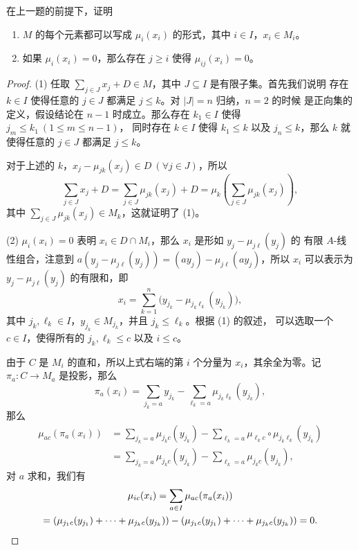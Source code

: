 \begin{problem}
  在上一题的前提下，证明
  \begin{enumerate}
    \item $M$ 的每个元素都可以写成 $\mu_i(x_i)$ 的形式，其中 $i\in I$，$x_i\in M_i$。
    \item 如果 $\mu_i(x_i)=0$，那么存在 $j\geq i$ 使得 $\mu_{ij}(x_i)=0$。
  \end{enumerate}
\end{problem}
\begin{proof}
  (1) 任取 $\sum_{j\in J}x_j+D\in M$，其中 $J\subseteq I$ 是有限子集。首先我们说明
  存在 $k\in I$ 使得任意的 $j\in J$ 都满足 $j\leq k$。对 $|J|=n$ 归纳，$n=2$ 的时候
  是正向集的定义，假设结论在 $n-1$ 时成立。那么存在 $k_1\in I$ 使得 $j_m\leq k_1\ (1\leq m\le n-1)$，
  同时存在 $k\in I$ 使得 $k_1\leq k$ 以及 $j_n\leq k$，那么 $k$ 就
  使得任意的 $j\in J$ 都满足 $j\leq k$。

  对于上述的 $k$，$x_j-\mu_{jk}(x_j)\in D\ (\forall j\in J)$，所以
  \[
    \sum_{j\in J}x_j+D=\sum_{j\in J}\mu_{jk}(x_j)+D=\mu_k\left(
      \sum_{j\in J}\mu_{jk}(x_j)
    \right)  ,
  \]
  其中 $\sum_{j\in J}\mu_{jk}(x_j)\in M_k$，这就证明了 (1)。

  (2) $\mu_i(x_i)=0$ 表明 $x_i\in D\cap M_i$，那么 $x_i$ 是形如 $y_j-\mu_{j\ell}(y_j)$ 的
  有限 $A$-线性组合，注意到 $a(y_j-\mu_{j\ell}(y_j))=(ay_j)-\mu_{j\ell}(ay_j)$，所以
  $x_i$ 可以表示为 $y_j-\mu_{j\ell}(y_j)$ 的有限和，即
  \[
    x_i=\sum_{k=1}^n \bigl(y_{j_k}-\mu_{j_k\ell_k}(y_{j_k})\bigr)  ,
  \]
  其中 $j_k,\ell_k\in I$，$y_{j_k}\in M_{j_k}$，并且 $j_k\leq\ell_k$。根据 (1) 的叙述，
  可以选取一个 $c\in I$，使得所有的 $j_k,\ell_k\leq c$ 以及 $i\leq c$。

  由于 $C$ 是 $M_i$ 的直和，所以上式右端的第 $i$ 个分量为 $x_i$，其余全为零。记
  $\pi_a:C\to M_a$ 是投影，那么
  \[
    \pi_a(x_i)=\sum_{j_k=a}y_{j_k}-\sum_{\ell_k=a}\mu_{j_k\ell_k}(y_{j_k}),  
  \]
  那么
  \begin{align*}
    \mu_{ac}(\pi_a(x_i))&=\sum_{j_k=a}\mu_{j_kc}(y_{j_k})
    -\sum_{\ell_k=a}\mu_{\ell_kc}\circ\mu_{j_k\ell_k}(y_{j_k})\\
    &=\sum_{j_k=a}\mu_{j_kc}(y_{j_k})
    -\sum_{\ell_k=a}\mu_{j_kc}(y_{j_k}),
  \end{align*}
  对 $a$ 求和，我们有
  \begin{gather*}
    \mu_{ic}(x_i)=\sum_{a\in I}\mu_{ac}(\pi_a(x_i))\\=
    (\mu_{j_1c}(y_{j_1})+\cdots+\mu_{j_kc}(y_{j_k}))-(\mu_{j_1c}(y_{j_1})+\cdots+\mu_{j_kc}(y_{j_k}))=0.
    \qedhere
  \end{gather*}
\end{proof}

